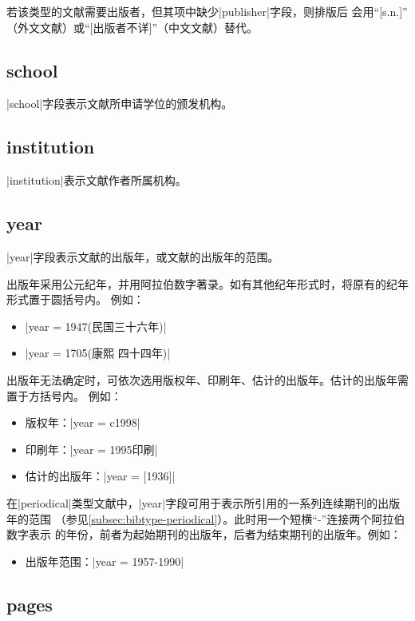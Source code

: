 若该类型的文献需要出版者，但其{\BibTeX}项中缺少|publisher|字段，则{\BibTeX}排版后
会用``[s.n.]'' （外文文献）或``[出版者不详]''（中文文献）替代。

\subsection{school}\label{subsec:bibfield-school}

|school|字段表示文献所申请学位的颁发机构。

\subsection{institution}\label{subsec:bibfield-institution}

|institution|表示文献作者所属机构。

\subsection{year}\label{subsec:bibfield-year}

|year|字段表示文献的出版年，或文献的出版年的范围。

出版年采用公元纪年，并用阿拉伯数字著录。如有其他纪年形式时，将原有的纪年形式置于圆括号内。
例如：
\begin{itemize}
\item |year = {1947(民国三十六年)}|
\item |year = {1705(康熙 四十四年)}|
\end{itemize}

出版年无法确定时，可依次选用版权年、印刷年、估计的出版年。估计的出版年需置于方括号内。
例如：
\begin{itemize}
\item 版权年：|year = {c1998}|
\item 印刷年：|year = 1995印刷|
\item 估计的出版年：|year = {[1936]}|
\end{itemize}

在|periodical|类型文献中，|year|字段可用于表示所引用的一系列连续期刊的出版年的范围
（参见\ref{subsec:bibtype-periodical}）。此时用一个短横``-''连接两个阿拉伯数字表示
的年份，前者为起始期刊的出版年，后者为结束期刊的出版年。例如：
\begin{itemize}
\item 出版年范围：|year = {1957-1990}|
\end{itemize}


\subsection{pages}\label{subsec:bibfield-pages}

